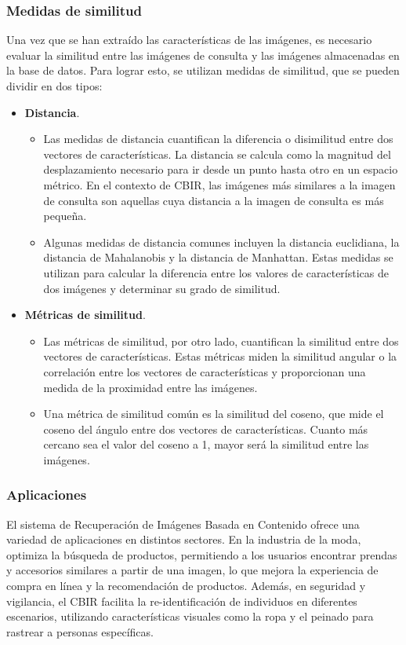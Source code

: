 \subsubsection{Medidas de similitud}
Una vez que se han extraído las características de las imágenes, es necesario evaluar la similitud entre las imágenes de consulta y las imágenes almacenadas en la base de datos. Para lograr esto, se utilizan medidas de similitud, que se pueden dividir en dos tipos:
\begin{itemize}
    \item \textbf{Distancia}. 
    \begin{itemize}
        \item Las medidas de distancia cuantifican la diferencia o disimilitud entre dos vectores de características. La distancia se calcula como la magnitud del desplazamiento necesario para ir desde un punto hasta otro en un espacio métrico. En el contexto de CBIR, las imágenes más similares a la imagen de consulta son aquellas cuya distancia a la imagen de consulta es más pequeña.
        \item Algunas medidas de distancia comunes incluyen la distancia euclidiana, la distancia de Mahalanobis y la distancia de Manhattan. Estas medidas se utilizan para calcular la diferencia entre los valores de características de dos imágenes y determinar su grado de similitud.
    \end{itemize}
    \item \textbf{Métricas de similitud}.
    \begin{itemize}
        \item Las métricas de similitud, por otro lado, cuantifican la similitud entre dos vectores de características. Estas métricas miden la similitud angular o la correlación entre los vectores de características y proporcionan una medida de la proximidad entre las imágenes.
        \item Una métrica de similitud común es la similitud del coseno, que mide el coseno del ángulo entre dos vectores de características. Cuanto más cercano sea el valor del coseno a 1, mayor será la similitud entre las imágenes.
    \end{itemize}
\end{itemize}

\subsubsection{Aplicaciones}
El sistema de Recuperación de Imágenes Basada en Contenido ofrece una variedad de aplicaciones en distintos sectores. En la industria de la moda, optimiza la búsqueda de productos, permitiendo a los usuarios encontrar prendas y accesorios similares a partir de una imagen, lo que mejora la experiencia de compra en línea y la recomendación de productos. Además, en seguridad y vigilancia, el CBIR facilita la re-identificación de individuos en diferentes escenarios, utilizando características visuales como la ropa y el peinado para rastrear a personas específicas.

